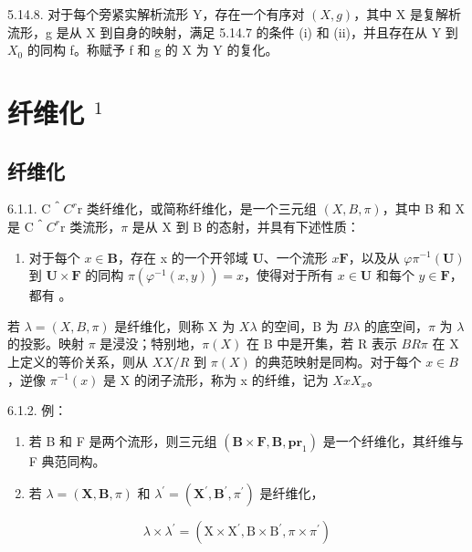5.14.8. 对于每个旁紧实解析流形 Y，存在一个有序对 \((X, g)\)，其中 X 是复解析流形，g 是从 X 到自身的映射，满足 5.14.7 的条件 (i) 和 (ii)，并且存在从 Y 到 \(X_{0}\) 的同构 f。称赋予 f 和 g 的 X 为 Y 的复化。

\section{\texorpdfstring{纤维化 \(^{1}\)}{纤维化 ¹}}

\subsection{纤维化}

6.1.1. C＾\(C^{r}\)r 类纤维化，或简称纤维化，是一个三元组 \((X, B, \pi)\)，其中 B 和 X 是 C＾\(C^{r}\)r 类流形，\(\pi\) 是从 X 到 B 的态射，并具有下述性质：

\begin{enumerate}
\def\labelenumi{(\Alph{enumi})}
\setcounter{enumi}{5}
\tightlist
\item
  对于每个 \(x \in \mathbf{B}\)，存在 x 的一个开邻域 \(\mathbf{U}\)、一个流形 \(x\)\(\mathbf{F}\)，以及从 \(\varphi\)\(\pi^{-1}(\mathbf{U})\) 到 \(\mathbf{U} \times \mathbf{F}\) 的同构 \(\pi(\varphi^{-1}(x, y)) = x\)，使得对于所有 \(x \in \mathbf{U}\) 和每个 \(y \in \mathbf{F}\)，都有 。
\end{enumerate}

若 \(\lambda = (X, B, \pi)\) 是纤维化，则称 X 为 \(X\)\(\lambda\) 的空间，B 为 \(B\)\(\lambda\) 的底空间，\(\pi\) 为 \(\lambda\) 的投影。映射 \(\pi\) 是浸没；特别地，\(\pi(X)\) 在 B 中是开集，若 R 表示 \(B\)\(R\)\(\pi\) 在 X 上定义的等价关系，则从 \(X\)\(X/R\) 到 \(\pi(X)\) 的典范映射是同构。对于每个 \(x \in B\)，逆像 \(\pi^{-1}(x)\) 是 X 的闭子流形，称为 x 的纤维，记为 \(X\)\(x\)\(X_x\)。

6.1.2. 例：

\begin{enumerate}
\def\labelenumi{(\alph{enumi})}
\item
  若 B 和 F 是两个流形，则三元组 \((\mathbf{B} \times \mathbf{F}, \mathbf{B}, \mathbf{pr}_{1})\) 是一个纤维化，其纤维与 F 典范同构。
\item
  若 \(\lambda = (\mathbf{X},\mathbf{B},\pi)\) 和 \(\lambda^{\prime} = (\mathbf{X}^{\prime},\mathbf{B}^{\prime},\pi^{\prime})\) 是纤维化，
\end{enumerate}

\[
\lambda \times \lambda^ {\prime} = (\mathrm{X} \times \mathrm{X} ^ {\prime}, \mathrm{B} \times \mathrm{B} ^ {\prime}, \pi \times \pi^ {\prime})
\]

